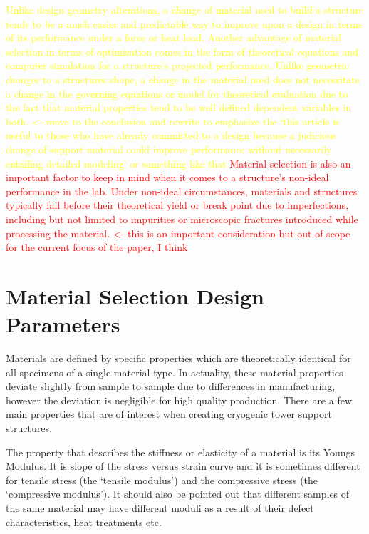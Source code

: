 \documentclass[final]{svjour2}
\begin{document}
\textcolor{yellow}{Unlike design geometry alterations, a change of material used to build a structure tends to be a much easier and predictable way to improve upon a design in terms of its performance under a force or heat load. Another advantage of material selection in terms of optimization comes in the form of theoretical equations and computer simulation for a structure's projected performance.  Unlike geometric changes to a structures shape, a change in the material used does not necessitate a change in the governing equations or model for theoretical evaluation due to the fact that material properties tend to be well defined dependent variables in both. <- move to the conclusion and rewrite to emphasize the `this article is useful to those who have already committed to a design because a judicious change of support material could improve performance without necessarily entailing detailed modeling' or something like that}
\textcolor{red}{Material selection is also an important factor to keep in mind when it comes to a structure's non-ideal performance in the lab. Under non-ideal circumstances, materials and structures typically fail before their theoretical yield or break point due to imperfections, including but not limited to impurities or microscopic fractures introduced while processing the material. <- this is an important consideration but out of scope for the current focus of the paper, I think}

\section{Material Selection Design Parameters}

Materials are defined by specific properties which are theoretically identical for all specimens of a single material type.  In actuality, these material properties deviate slightly from sample to sample due to differences in manufacturing, however the deviation is negligible for high quality production.  There are a few main properties that are of interest when creating cryogenic tower support structures.  

The property that describes the stiffness or elasticity of a material is its Youngs Modulus. It is slope of the stress versus strain curve and it is sometimes different for tensile stress (the `tensile modulus') and the compressive stress (the `compressive modulus'). It should also be pointed out that different samples of the same material may have different moduli as a result of their defect characteristics, heat treatments etc. 
\end{document}
